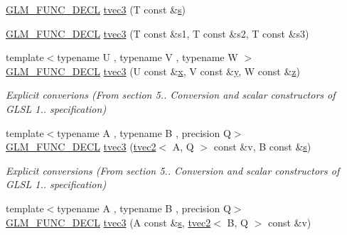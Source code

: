 \begin{DoxyCompactItemize}
\hyperlink{setup_8hpp_ab2d052de21a70539923e9bcbf6e83a51}{G\+L\+M\+\_\+\+F\+U\+N\+C\+\_\+\+D\+E\+CL} \hyperlink{structglm_1_1detail_1_1tvec3_a2a9b1dc81918af347e4726ee1666d5de}{tvec3} (T const \&\hyperlink{structglm_1_1detail_1_1tvec3_aa7906d8cd1a54c96ba22c1f97ebaf7cc}{s})
\item 
\hyperlink{setup_8hpp_ab2d052de21a70539923e9bcbf6e83a51}{G\+L\+M\+\_\+\+F\+U\+N\+C\+\_\+\+D\+E\+CL} \hyperlink{structglm_1_1detail_1_1tvec3_af282d8b360f521784a9a5a5240451aec}{tvec3} (T const \&s1, T const \&s2, T const \&s3)
\item 
{\footnotesize template$<$typename U , typename V , typename W $>$ }\\\hyperlink{setup_8hpp_ab2d052de21a70539923e9bcbf6e83a51}{G\+L\+M\+\_\+\+F\+U\+N\+C\+\_\+\+D\+E\+CL} \hyperlink{structglm_1_1detail_1_1tvec3_aa1c2ac2585b673f7238017266ba427e9}{tvec3} (U const \&\hyperlink{structglm_1_1detail_1_1tvec3_a9c7bc0ecd949a50b911cda1800c4a9c6}{x}, V const \&\hyperlink{structglm_1_1detail_1_1tvec3_a3de16793bf75ea1e959c3d044709ded7}{y}, W const \&\hyperlink{structglm_1_1detail_1_1tvec3_a9996ce4dc16af21710bd1f7102fa66a7}{z})
\begin{DoxyCompactList}\small\item\em Explicit converions (From section 5.. Conversion and scalar constructors of G\+L\+SL 1.. specification) \end{DoxyCompactList}\item 
{\footnotesize template$<$typename A , typename B , precision Q$>$ }\\\hyperlink{setup_8hpp_ab2d052de21a70539923e9bcbf6e83a51}{G\+L\+M\+\_\+\+F\+U\+N\+C\+\_\+\+D\+E\+CL} \hyperlink{structglm_1_1detail_1_1tvec3_aa267579f4071920b9908f7ec7779cfe1}{tvec3} (\hyperlink{structglm_1_1detail_1_1tvec2}{tvec2}$<$ A, Q $>$ const \&v, B const \&\hyperlink{structglm_1_1detail_1_1tvec3_aa7906d8cd1a54c96ba22c1f97ebaf7cc}{s})
\begin{DoxyCompactList}\small\item\em Explicit conversions (From section 5.. Conversion and scalar constructors of G\+L\+SL 1.. specification) \end{DoxyCompactList}\item 
{\footnotesize template$<$typename A , typename B , precision Q$>$ }\\\hyperlink{setup_8hpp_ab2d052de21a70539923e9bcbf6e83a51}{G\+L\+M\+\_\+\+F\+U\+N\+C\+\_\+\+D\+E\+CL} \hyperlink{structglm_1_1detail_1_1tvec3_a0c479351c5b7c950e5470b8ed287997d}{tvec3} (A const \&\hyperlink{structglm_1_1detail_1_1tvec3_aa7906d8cd1a54c96ba22c1f97ebaf7cc}{s}, \hyperlink{structglm_1_1detail_1_1tvec2}{tvec2}$<$ B, Q $>$ const \&v)

\end{DoxyCompactItemize}
